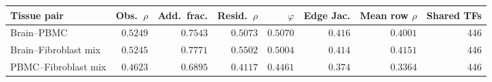 \begingroup\footnotesize
\begin{tabular}{lrrrrrrr}
\toprule
Tissue pair & Obs.\ $\rho$ & Add.\ frac. & Resid.\ $\rho$ & $\varphi$ & Edge Jac. & Mean row $\rho$ & Shared TFs \\ 
\midrule
Brain--PBMC & $0.5249$ & $0.7543$ & $0.5073$ & $0.5070$ & $0.416$ & $0.4001$ & 446 \\
Brain--Fibroblast mix & $0.5245$ & $0.7771$ & $0.5502$ & $0.5004$ & $0.414$ & $0.4151$ & 446 \\
PBMC--Fibroblast mix & $0.4623$ & $0.6895$ & $0.4117$ & $0.4461$ & $0.374$ & $0.3364$ & 446 \\
\bottomrule
\end{tabular}
\endgroup
